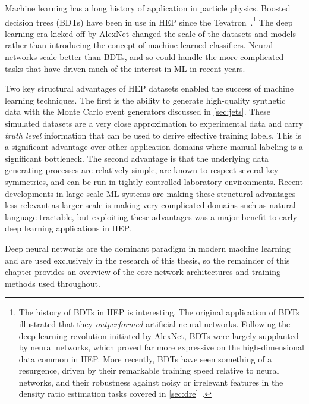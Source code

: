 Machine learning has a long history of application in particle physics.
Boosted decision trees (BDTs) have been in use in HEP since the Tevatron~\cite{D0:2006ngk,CDF:2009itk}.\footnote{The history of BDTs in HEP is interesting. The original application of BDTs illustrated that they \textit{outperformed} artificial neural networks. Following the deep learning revolution initiated by AlexNet, BDTs were largely supplanted by neural networks, which proved far more expressive on the high-dimensional data common in HEP. More recently, BDTs have seen something of a resurgence, driven by their remarkable training speed relative to neural networks, and their robustness against noisy or irrelevant features in the density ratio estimation tasks covered in \cref{sec:dre}~\cite{Finke:2023ltw}.}
The deep learning era kicked off by AlexNet changed the scale of the datasets and models rather than introducing the concept of machine learned classifiers.
Neural networks scale better than BDTs, and so could handle the more complicated tasks that have driven much of the interest in ML in recent years.

Two key structural advantages of HEP datasets enabled the success of machine learning techniques.
The first is the ability to generate high-quality synthetic data with the Monte Carlo event generators discussed in \cref{sec:jets}.
These simulated datasets are a very close approximation to experimental data and carry \textit{truth level} information that can be used to derive effective training labels.
This is a significant advantage over other application domains where manual labeling is a significant bottleneck.
The second advantage is that the underlying data generating processes are relatively simple, are known to respect several key symmetries, and can be run in tightly controlled laboratory environments.
Recent developments in large scale ML systems are making these structural advantages less relevant as larger scale is making very complicated domains such as natural language tractable, but exploiting these advantages was a major benefit to early deep learning applications in HEP.

Deep neural networks are the dominant paradigm in modern machine learning and are used exclusively in the research of this thesis, so the remainder of this chapter provides an overview of the core network architectures and training methods used throughout.
